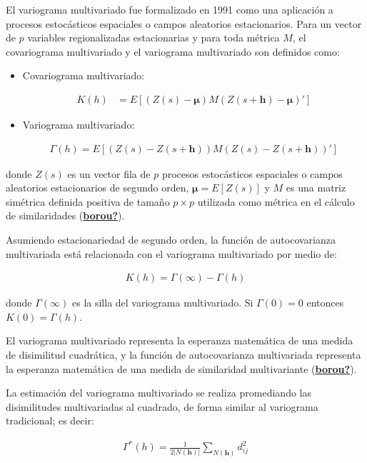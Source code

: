 \documentclass[
]{book}
\begin{document}
El variograma multivariado fue formalizado en 1991 como una aplicación a procesos estocásticos espaciales o campos aleatorios estacionarios. Para un vector de \(p\) variables regionalizadas estacionarias y para toda métrica \(M\), el covariograma multivariado y el variograma multivariado son definidos como:

\begin{itemize}
\item
  Covariograma multivariado:

  \begin{align}
        K(h)&=E[(Z(s)-\boldsymbol \mu)M(Z(s+\textbf{h})-\boldsymbol \mu){'}]
    \end{align}
\item
  Variograma multivariado:

  \begin{align}
        \Gamma(h)=E[(Z(s)-Z(s+\textbf{h}))M(Z(s)-Z(s+\textbf{h}))']
    \end{align}
\end{itemize}

donde \(Z(s)\) es un vector fila de \(p\) procesos estocásticos espaciales o campos aleatorios estacionarios de segundo orden, \(\boldsymbol \mu=E[Z(s)]\) y \(M\) es una matriz simétrica definida positiva de tamaño \(p\times p\) utilizada como métrica en el cálculo de similaridades (\protect\hyperlink{ref-borou}{\textbf{borou?}}).

Asumiendo estacionariedad de segundo orden, la función de autocovarianza multivariada está relacionada con el variograma multivariado por medio de:

\begin{align}
    K(h)=\Gamma(\infty)-\Gamma(h)
\end{align}

donde \(\Gamma(\infty)\) es la silla del variograma multivariado. Si \(\Gamma(0)=0\) entonces \(K(0)=\Gamma(h)\).

El variograma multivariado representa la esperanza matemática de una medida de disimilitud cuadrática, y la función de autocovarianza multivariada representa la esperanza matemática de una medida de similaridad multivariante (\protect\hyperlink{ref-borou}{\textbf{borou?}}).

La estimación del variograma multivariado se realiza promediando las disimilitudes multivariadas al cuadrado, de forma similar al variograma tradicional; es decir:

\begin{align}
    \Gamma^*(h)=\frac{1}{2|N(\textbf{h})|}\sum_{N(\textbf{h})}d_{ij}^2
\end{align}
\end{document}
